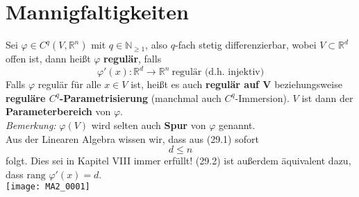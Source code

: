 \documentclass[a4paper,12pt,portrait]{book}
\newcommand{\rang}{\text{rang\ }}
\theoremstyle{theoremstyle}
\begin{document}
\section{Mannigfaltigkeiten}
Sei $\varphi\in C^q(V,\mathbb{R}^n)$ mit $q\in\mathbb{N}_{\geq 1}$, also $q$-fach stetig differenzierbar, wobei $V\subset\mathbb{R}^d$ offen ist, dann heißt $\varphi$ \textbf{regulär}, falls
\begin{equation}
\varphi'(x):\mathbb{R}^d\rightarrow\mathbb{R}^n \ \text{regulär (d.h. injektiv)}
\end{equation}
Falls $\varphi$ regulär für alle $x\in V$ ist, heißt es auch \textbf{regulär auf V} beziehungsweise \textbf{reguläre $C^q$-Parametrisierung} (manchmal auch $C^q$-Immersion). $V$ ist dann der \textbf{Parameterbereich} von $\varphi$.\\
\emph{Bemerkung:} $\varphi(V)$ wird selten auch \textbf{Spur} von $\varphi$ genannt.\\
\linebreak\linebreak
Aus der Linearen Algebra wissen wir, dass aus (29.1) sofort 
\begin{equation}
d\leq n
\end{equation}
folgt. Dies sei in Kapitel VIII immer erfüllt! (29.2) ist außerdem äquivalent dazu, dass $\rang \varphi'(x)=d$.\\
\texttt{[image: MA2\_0001]}
\end{document}

